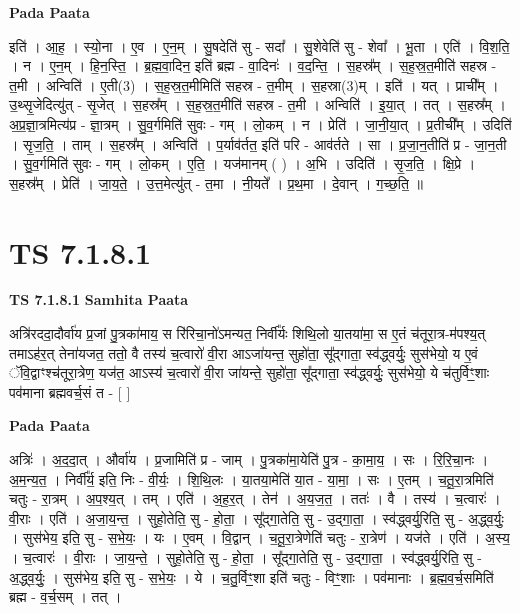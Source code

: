 \documentclass[17pt]{extarticle}
\begin{document}
\textbf{Pada Paata} \newline

इति॑ । आ॒ह॒ । स्यो॒ना । ए॒व । ए॒न॒म् । सु॒षदेति॑ सु - सदा᳚ । सु॒शेवेति॑ सु - शेवा᳚ । भू॒ता । एति॑ । वि॒श॒ति॒ । न । ए॒न॒म् । हि॒न॒स्ति॒ । ब्र॒ह्म॒वा॒दिन॒ इति॑ ब्रह्म - वा॒दिनः॑ । व॒द॒न्ति॒ । स॒हस्र᳚म् । स॒ह॒स्र॒त॒मीति॑ सहस्र - त॒मी । अन्विति॑ । ए॒ती(3) । स॒ह॒स्र॒त॒मीमिति॑ सहस्र - त॒मीम् । स॒हस्रा(3)म् । इति॑ । यत् । प्राची᳚म् । उ॒थ्सृ॒जेदित्यु॑त् - सृ॒जेत् । स॒हस्र᳚म् । स॒ह॒स्र॒त॒मीति॑ सहस्र - त॒मी । अन्विति॑ । इ॒या॒त् । तत् । स॒हस्र᳚म् । अ॒प्र॒ज्ञा॒त्रमित्य॑प्र - ज्ञा॒त्रम् । सु॒व॒र्गमिति॑ सुवः - गम् । लो॒कम् । न । प्रेति॑ । जा॒नी॒या॒त् । प्र॒तीची᳚म् । उदिति॑ । सृ॒ज॒ति॒ । ताम् । स॒हस्र᳚म् । अन्विति॑ । प॒र्याव॑र्तत॒ इति॑ परि - आव॑र्तते । सा । प्र॒जा॒न॒तीति॑ प्र - जा॒न॒ती । सु॒व॒र्गमिति॑ सुवः - गम् । लो॒कम् । ए॒ति॒ । यज॑मानम् ( ) । अ॒भि । उदिति॑ । सृ॒ज॒ति॒ । क्षि॒प्रे । स॒हस्र᳚म् । प्रेति॑ । जा॒य॒ते॒ । उ॒त्त॒मेत्यु॑त् - त॒मा । नी॒यते᳚ । प्र॒थ॒मा । दे॒वान् । ग॒च्छ॒ति॒ ॥  \newline





\section{ TS 7.1.8.1 }

\textbf{TS 7.1.8.1 } \newline
\textbf{Samhita Paata} \newline

अत्रि॑रददा॒दौर्वा॑य प्र॒जां पु॒त्रका॑माय॒ स रि॑रिचा॒नो॑ऽमन्यत॒ निर्वी᳚र्यः शिथि॒लो या॒तया॑मा॒ स ए॒तं च॑तूरा॒त्र-म॑पश्य॒त् तमाऽह॑र॒त् तेना॑यजत॒ ततो॒ वै तस्य॑ च॒त्वारो॑ वी॒रा आऽजा॑यन्त॒ सुहो॑ता॒ सू᳚द्गाता॒ स्व॑द्ध्वर्युः॒ सुस॑भेयो॒ य ए॒वं ॅवि॒द्वाꣳश्च॑तूरा॒त्रेण॒ यज॑त॒ आऽस्य॑ च॒त्वारो॑ वी॒रा जा॑यन्ते॒ सुहो॑ता॒ सू᳚द्गाता॒ स्व॑द्ध्वर्युः॒ सुस॑भेयो॒ ये च॑तुर्विꣳ॒॒शाः पव॑माना ब्रह्मवर्च॒सं त - [  ] \newline

\textbf{Pada Paata} \newline

अत्रिः॑ । अ॒द॒दा॒त् । और्वा॑य । प्र॒जामिति॑ प्र - जाम् । पु॒त्रका॑मा॒येति॑ पु॒त्र - का॒मा॒य॒ । सः । रि॒रि॒चा॒नः । अ॒म॒न्य॒त॒ । निर्वी᳚र्य॒ इति॒ निः - वी॒र्यः॒ । शि॒थि॒लः । या॒तया॒मेति॑ या॒त - या॒मा॒ । सः । ए॒तम् । च॒तू॒रा॒त्रमिति॑ चतुः - रा॒त्रम् । अ॒प॒श्य॒त् । तम् । एति॑ । अ॒ह॒र॒त् । तेन॑ । अ॒य॒ज॒त॒ । ततः॑ । वै । तस्य॑ । च॒त्वारः॑ । वी॒राः । एति॑ । अ॒जा॒य॒न्त॒ । सुहो॒तेति॒ सु - हो॒ता॒ । सू᳚द्गा॒तेति॒ सु - उ॒द्गा॒ता॒ । स्व॑द्ध्वर्यु॒रिति॒ सु - अ॒द्ध्व॒र्युः॒ । सुस॑भेय॒ इति॒ सु - स॒भे॒यः॒ । यः । ए॒वम् । वि॒द्वान् । च॒तू॒रा॒त्रेणेति॑ चतुः - रा॒त्रेण॑ । यज॑ते । एति॑ । अ॒स्य॒ । च॒त्वारः॑ । वी॒राः । जा॒य॒न्ते॒ । सुहो॒तेति॒ सु - हो॒ता॒ । सू᳚द्गा॒तेति॒ सु - उ॒द्गा॒ता॒ । स्व॑द्ध्वर्यु॒रिति॒ सु - अ॒द्ध्व॒र्युः॒ । सुस॑भेय॒ इति॒ सु - स॒भे॒यः॒ । ये । च॒तु॒र्विꣳ॒॒शा इति॑ चतुः - विꣳ॒॒शाः । पव॑मानाः । ब्र॒ह्म॒व॒र्च॒समिति॑ ब्रह्म - व॒र्च॒सम् । तत् ।  \newline
\end{document}
